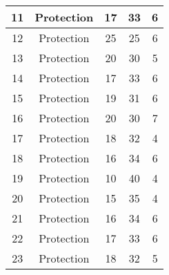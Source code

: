 \documentclass[results.tex]{subfiles}
\begin{document}
\begin{center}
\begin{tabular}{| c || c | c | c | c |}
            \hline
            11                      & Protection                   & 17                     & 33                      & 6                    \\
            \hline
            12                      & Protection                   & 25                     & 25                      & 6                    \\
            \hline
            13                      & Protection                   & 20                     & 30                      & 5                    \\
            \hline
            14                      & Protection                   & 17                     & 33                      & 6                    \\
            \hline
            15                      & Protection                   & 19                     & 31                      & 6                    \\
            \hline
            16                      & Protection                   & 20                     & 30                      & 7                    \\
            \hline
            17                      & Protection                   & 18                     & 32                      & 4                    \\
            \hline
            18                      & Protection                   & 16                     & 34                      & 6                    \\
            \hline
            19                      & Protection                   & 10                     & 40                      & 4                    \\
            \hline
            20                      & Protection                   & 15                     & 35                      & 4                    \\
            \hline
            21                      & Protection                   & 16                     & 34                      & 6                    \\
            \hline
            22                      & Protection                   & 17                     & 33                      & 6                    \\
            \hline
            23                      & Protection                   & 18                     & 32                      & 5                    \\

\end{tabular}
\end{center}
\end{document}
